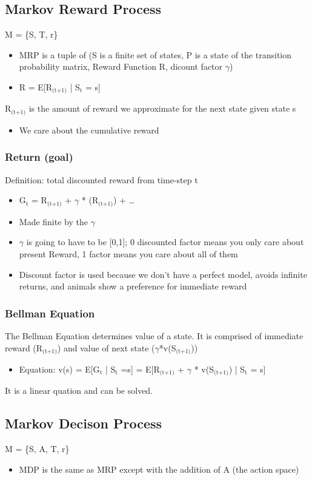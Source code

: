 \documentclass[11pt]{article}
\begin{document}
\subsection{Markov Reward Process}
\label{sec-3-3}
M = \{S, T, r\}
\begin{itemize}
\item MRP is a tuple of (S is a finite set of states, P is a state of the transition probability matrix, Reward Function R, dicount factor $\gamma$)
\item R = E[R$_{\text{(t+1)}}$ | S$_{\text{t}}$ = s]
\end{itemize}
R$_{\text{(t+1)}}$ is the amount of reward we approximate for the next state given state s
\begin{itemize}
\item We care about the cumulative reward
\end{itemize}
\subsubsection{Return (goal)}
\label{sec-3-3-1}
Definition: total discounted reward from time-step t
\begin{itemize}
\item G$_{\text{t}}$ = R$_{\text{(t+1)}}$ + $\gamma$ * (R$_{\text{(t+1)}}$) +  \ldots{}
\item Made finite by the $\gamma$
\item $\gamma$ is going to have to be [0,1]; 0 discounted factor means you only care about present Reward, 1 factor means you care about all of them
\item Discount factor is used because we don't have a perfect model, avoids infinite returns, and animals show a preference for immediate reward
\end{itemize}
\subsubsection{Bellman Equation}
\label{sec-3-3-2}
The Bellman Equation determines value of a state. It is comprised of immediate reward (R$_{\text{(t+1)}}$) and value of next state ($\gamma$*v(S$_{\text{(t+1)}}$))
\begin{itemize}
\item Equation: v(s) = E[G$_{\text{t}}$ | S$_{\text{t}}$ =s] = E[R$_{\text{(t+1)}}$ + $\gamma$ * v(S$_{\text{(t+1)}}$) | S$_{\text{t}}$ = s]
\end{itemize}
It is a linear quation and can be solved. 
\subsection{Markov Decison Process}
\label{sec-3-4}
M = \{S, A, T, r\}
\begin{itemize}
\item MDP is the same as MRP except with the addition of A (the action space)
\end{itemize}
\end{document}
